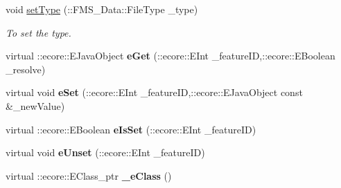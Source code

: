 \begin{DoxyCompactItemize}
void \hyperlink{classFMS__Data_1_1DirEntry_af67e69dfd48faf56f1d5b081e9b8f432}{setType} (::FMS\_\-Data::FileType \_\-type)
\begin{DoxyCompactList}\small\item\em To set the type. \item\end{DoxyCompactList}\item 
\hypertarget{classFMS__Data_1_1DirEntry_a766203a6f36059747d89a7fbfc10ecc9}{
virtual ::ecore::EJavaObject {\bfseries eGet} (::ecore::EInt \_\-featureID,::ecore::EBoolean \_\-resolve)}
\label{classFMS__Data_1_1DirEntry_a766203a6f36059747d89a7fbfc10ecc9}

\item 
\hypertarget{classFMS__Data_1_1DirEntry_a71ff03447ed100ce6681442d11387136}{
virtual void {\bfseries eSet} (::ecore::EInt \_\-featureID,::ecore::EJavaObject const \&\_\-newValue)}
\label{classFMS__Data_1_1DirEntry_a71ff03447ed100ce6681442d11387136}

\item 
\hypertarget{classFMS__Data_1_1DirEntry_ab8bb9ace5c98d530a83d92c961a5f126}{
virtual ::ecore::EBoolean {\bfseries eIsSet} (::ecore::EInt \_\-featureID)}
\label{classFMS__Data_1_1DirEntry_ab8bb9ace5c98d530a83d92c961a5f126}

\item 
\hypertarget{classFMS__Data_1_1DirEntry_ac219453094949b4a7edfa2dffd990ca7}{
virtual void {\bfseries eUnset} (::ecore::EInt \_\-featureID)}
\label{classFMS__Data_1_1DirEntry_ac219453094949b4a7edfa2dffd990ca7}

\item 
\hypertarget{classFMS__Data_1_1DirEntry_a07aafa7cf7adb0eee41240cc5684b4a1}{
virtual ::ecore::EClass\_\-ptr {\bfseries \_\-eClass} ()}
\label{classFMS__Data_1_1DirEntry_a07aafa7cf7adb0eee41240cc5684b4a1}

\end{DoxyCompactItemize}
